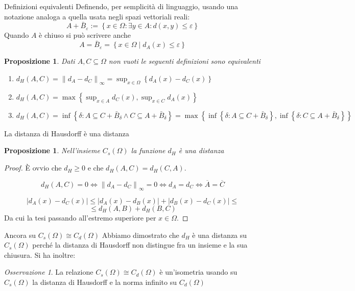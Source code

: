 \documentclass{beamer}
\newcounter{counter1}
\theoremstyle{plain}
\newtheorem{mypro}[counter1]{Proposizione}
\theoremstyle{definition}
\theoremstyle{remark}
\newtheorem{myoss}[counter1]{Osservazione}
\newcommand{\obar}[1]{\overline{#1}}
\newcommand{\set}[1]{\left\{#1\right\}}
\newcommand{\abs}[1]{\left|#1\right|}
\newcommand{\norm}[1]{\left\|#1\right\|}
\begin{document}
\begin{frame}{Definizioni equivalenti}
  Definendo, per semplicità di linguaggio, usando una notazione
  analoga a quella usata negli spazi vettoriali reali:
  \[ A + \bar B_\varepsilon := \set{ x \in \Omega : \exists y \in A :
    d(x,y) \le \varepsilon } \]
  Quando $A$ è chiuso si può scrivere anche
  \[ A = \bar B _{\varepsilon} = \set{ x \in \Omega \mid d_A(x) \le
    \varepsilon} \] 
  \begin{mypro}
    Dati $A, C \subseteq \Omega$ non vuoti le seguenti definizioni
    sono equivalenti
    \begin{enumerate}
    \item $ d_H (A,C) = \norm{ d_A - d_C } _\infty = \sup _{x\in \Omega}
      \set {d_A(x) - d_C(x)}$
    \item $d_H(A,C) = \max \set{\sup _{x\in A} d_C (x) , \sup _{x\in C}
        d_A (x) }$
    \item $d_H (A,C) = \inf \set{\delta : A \subseteq C + \bar B
        _\delta \wedge C \subseteq A + \bar B_\delta} = \max \set{\inf
        \set{\delta : A \subseteq C + \bar B _\delta }, \inf \set{\delta : C
          \subseteq A + \bar B _\delta }}  $
    \end{enumerate}
  \end{mypro}
\end{frame}

\begin{frame}{La distanza di Hausdorff è una distanza}
  \begin{mypro}
    Nell'insieme $C_s(\Omega)$ la funzione $d_H$ è una distanza
  \end{mypro}
  \begin{proof}
    È ovvio che $d_H \ge 0$ e che $d_H(A,C) = d_H(C,A)$.

    \[d_H(A,C) = 0 \Leftrightarrow  \norm{d_A - d_C}_\infty = 0
    \Leftrightarrow d_A = d_C \Leftrightarrow \obar A = \obar C \]
    
    \[ \abs{d_A(x) - d_C(x)} \le \abs{d_A(x) - d_B(x)} + \abs{d_B(x) -
      d_C(x)} \le \] \[ \le d_H(A,B) + d_H(B,C) \]
    Da cui la tesi passando all'estremo superiore per $x\in \Omega$.
  \end{proof}
\end{frame}

\begin{frame}{Ancora su $C_s(\Omega) \cong C _d (\Omega)$}
  Abbiamo dimostrato che $d_H$ è una distanza su $C_s(\Omega)$ perché
  la distanza di Hausdorff non distingue fra un insieme e la sua
  chiusura.
  \vfill
  Si ha inoltre:
  \begin{myoss}
    La relazione $C_s(\Omega) \cong C_d(\Omega)$ è un'isometria usando
    su $C_s(\Omega)$ la distanza di Hausdorff e la norma infinito su
    $C_d(\Omega)$
  \end{myoss}
\end{frame}
\end{document}
